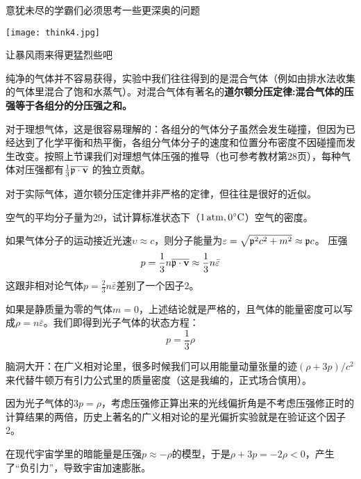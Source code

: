 \documentclass[CJK]{beamer}
\begin{document}
\begin{frame}
\bch
意犹未尽的学霸们必须思考一些更深奥的问题

\bcenter
{}
\texttt{[image: think4.jpg]}

让暴风雨来得更猛烈些吧
\emini
\ecenter
\ech
\end{frame}


\begin{frame}
\bch
纯净的气体并不容易获得，实验中我们往往得到的是混合气体（例如由排水法收集的气体里混合了饱和水蒸气）。对混合气体有著名的{\bf 道尔顿分压定律:混合气体的压强等于各组分的分压强之和。}

\skipline

对于理想气体，这是很容易理解的：各组分的气体分子虽然会发生碰撞，但因为已经达到了化学平衡和热平衡，各组分气体分子的速度和位置分布密度不因碰撞而发生改变。按照上节课我们对理想气体压强的推导（也可参考教材第28页），每种气体对压强都有$\frac{1}{3}\overline{\mathbf{\mathfrak{p}}\cdot{\mathbf{v}}}$ 的独立贡献。

\skipline

对于实际气体，道尔顿分压定律并非严格的定律，但往往是很好的近似。
\ech
\end{frame}


\begin{frame}
\bch
空气的平均分子量为29，试计算标准状态下（$1\,\mathrm{atm}, 0^\circ \mathrm{C}$）空气的密度。
\ech
\end{frame}

\begin{frame}
\bch
{\small
如果气体分子的运动接近光速$\upsilon \approx c$，则分子能量为$\varepsilon = \sqrt{{\mathfrak{p}}^2c^2 + m^2}\approx {\mathfrak{p}} c$。
压强
$$ p = \frac{1}{3}n \overline{{\mathfrak{p}}\cdot {\mathbf{v}}} \approx \frac{1}{3} n \bar{\varepsilon}$$
这跟非相对论气体$p = \frac{2}{3}n \bar{\varepsilon}$差别了一个因子2。

如果是静质量为零的气体$m=0$，上述结论就是严格的，且气体的能量密度可以写成$\rho = n\bar{\varepsilon}$。我们即得到光子气体的状态方程：
$$p = \frac{1}{3}\rho$$
}
{\darkblue \scriptsize 脑洞大开：在广义相对论里，很多时候我们可以用能量动量张量的迹$(\rho + 3p)/c^2$来代替牛顿万有引力公式里的质量密度（这是我编的，正式场合慎用）。
\bitem
\item{\darkblue  因为光子气体的$3p = \rho$，考虑压强修正算出来的光线偏折角是不考虑压强修正时的计算结果的两倍，历史上著名的广义相对论的星光偏折实验就是在验证这个因子2。}
\item{\darkblue  在现代宇宙学里的暗能量是压强$ p \approx -\rho$的模型，于是$\rho + 3p = -2\rho <0$，产生了“负引力”，导致宇宙加速膨胀。}
\eitem
}
\ech
\end{frame}
\end{document}
